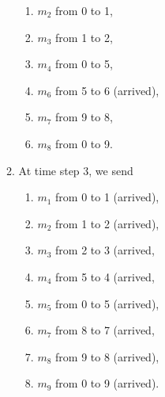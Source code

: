 \begin{parts}
\begin{solution}
\begin{enumerate}
\begin{enumerate}
          \begin{enumerate}
            \item $m_2$ from 0 to 1,
            \item $m_3$ from 1 to 2,
            \item $m_4$ from 0 to 5,
            \item $m_6$ from 5 to 6 (arrived),
            \item $m_7$ from 9 to 8,
            \item $m_8$ from 0 to 9.
          \end{enumerate}
          \item At time step 3, we send
          \begin{enumerate}
            \item $m_1$ from 0 to 1 (arrived),
            \item $m_2$ from 1 to 2 (arrived),
            \item $m_3$ from 2 to 3 (arrived,
            \item $m_4$ from 5 to 4 (arrived,
            \item $m_5$ from 0 to 5 (arrived),
            \item $m_7$ from 8 to 7 (arrived,
            \item $m_8$ from 9 to 8 (arrived),
            \item $m_9$ from 0 to 9 (arrived).
          \end{enumerate}
        \end{enumerate}


\end{enumerate}
\end{solution}
\end{parts}
